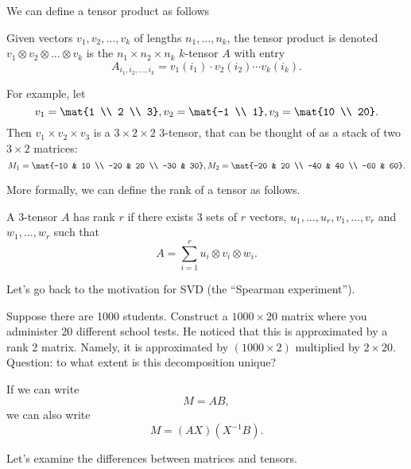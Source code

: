 We can define a tensor product as follows \\
\begin{definition}
  Given vectors $v_1, v_2, \dots, v_k$ of lengths $n_1, \dots, n_k$, the tensor product is denoted $v_1 \otimes v_2 \otimes \dots \otimes v_k$ is the $n_1 \times n_2 \times n_k$ $k$-tensor $A$ with entry
  \[
    A_{i_1, i_2, \dots, i_k} = v_1(i_1) \cdot v_2(i_2) \cdots v_k (i_k).
  \]
\end{definition}

\begin{example}
  For example, let
  \[
    v_1 = \mat{1 \\ 2 \\ 3}, v_2 = \mat{-1 \\ 1}, v_3 = \mat{10 \\ 20}.
  \]
  Then $v_1 \times v_2 \times v_3$ is a $3 \times 2 \times 2$ 3-tensor, that can be thought of as a stack of two $3 \times 2$ matrices:
  \[
    M_1 = \mat{-10 & 10 \\ -20 & 20 \\ -30 & 30}, M_2 = \mat{-20 & 20 \\ -40 & 40 \\ -60 & 60}.
  \]
\end{example}

More formally, we can define the rank of a tensor as follows.

\begin{definition}
  A $3$-tensor $A$ has rank $r$ if there exists 3 sets of $r$ vectors, $u_1, \dots, u_r, v_1, \dots, v_r$ and $w_1, \dots, w_r$ such that
  \[
    A = \sum_{i=1}^{r} u_i \otimes v_i \otimes w_i.
  \]
\end{definition}

Let's go back to the motivation for SVD (the ``Spearman experiment'').

Suppose there are 1000 students.  Construct a $1000 \times 20$ matrix where you administer 20 different school tests.  He noticed that this is approximated by a rank 2 matrix.  Namely, it is approximated by $(1000 \times 2)$ multiplied by $2 \times 20$.  Question: to what extent is this decomposition unique?

If we can write
\[
  M = AB,
\]
we can also write
\[
  M = (AX) (X^{-1} B).
\]

Let's examine the differences between matrices and tensors.

